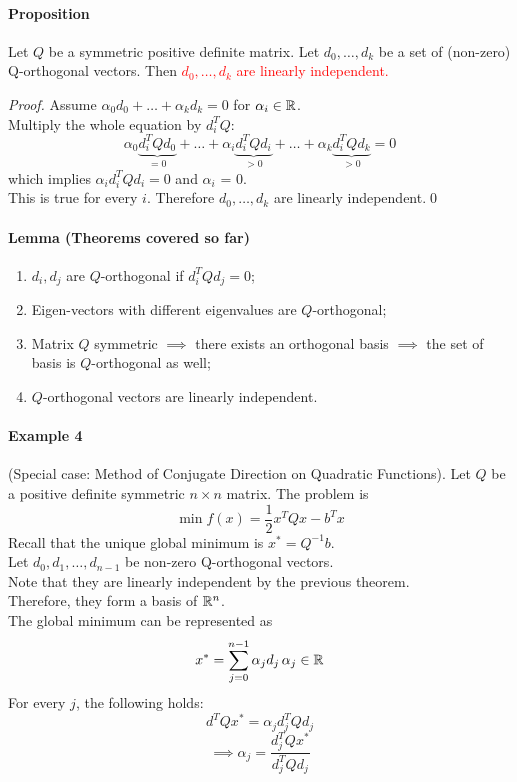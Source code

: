 \documentclass[11pt]{article}
\begin{document}
\paragraph{Proposition}
Let $Q$ be a symmetric positive definite matrix. Let $d_0, \hdots, d_k$ be a set of (non-zero) Q-orthogonal vectors. Then \textcolor{red}{$d_0, \hdots, d_k$ are linearly independent.} \\
\begin{proof}
	Assume $\alpha_0 d_0 + \hdots + \alpha_kd_k = 0$ for $\alpha_i \in \mathbb{R}$. \\
	Multiply the whole equation by $d_i^T Q$:
	$$\alpha_0 \underbrace{d_i^T Qd_0}_{=0} + \hdots + \alpha_i \underbrace{d_i^TQd_i}_{>0} + \hdots + \alpha_k \underbrace{d_i^T Qd_k}_{>0} = 0$$
	which implies $\alpha_i d_i^TQd_i = 0$ and $\alpha_i$ = 0. \\
	This is true for every $i$. Therefore $d_0, \hdots, d_k$ are linearly independent.\qed
\end{proof}

\paragraph{Lemma (Theorems covered so far)}
\begin{enumerate}
	\item $d_i, d_j$ are $Q$-orthogonal if $d_i^TQd_j = 0$;
	\item Eigen-vectors with different eigenvalues are $Q$-orthogonal;
	\item Matrix $Q$ symmetric $\implies$ there exists an orthogonal basis $\implies$ the set of basis is $Q$-orthogonal as well;
	\item $Q$-orthogonal vectors are linearly independent.
\end{enumerate}

\paragraph{Example 4} (Special case: Method of Conjugate Direction on Quadratic Functions). Let $Q$ be a positive definite symmetric $n \times n$ matrix. The problem is
$$\min f(x) = \frac{1}{2}x^TQx - b^Tx$$
Recall that the unique global minimum is $x^* = Q^{-1}b$. \\
Let $d_0, d_1, \hdots, d_{n-1}$ be non-zero Q-orthogonal vectors. \\
Note that they are linearly independent by the previous theorem. \\
Therefore, they form a basis of $\mathbb{R}^n$. \\
The global minimum can be represented as 
$$x^* = \sum_{j=0}^{n-1} \alpha_j d_j \, \alpha_j \in \mathbb{R}$$
For every $j$, the following holds:
$$d^TQx^* = \alpha_jd_j^TQd_j$$
$$\implies \alpha_j = \frac{d_j^TQx^*}{d_j^TQd_j}$$
\end{document}
